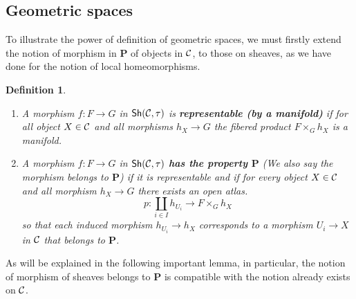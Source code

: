 \documentclass{tufte-book} %
\numberwithin{dummy}{section}
\newtheorem{dfn}[thm]{Definition}
\newcommand{\calc}{{\cal C}}
\newcommand{\lrta}{\longrightarrow}
\newcommand{\ssh}{\mathsf{Sh}}
\newcommand{\bfp}{\mathbf{P}}
\begin{document}
\subsection{Geometric spaces}
To illustrate the  power of definition of geometric spaces, we must firstly extend the notion of morphism in $\bfp$ of objects in $\calc$, to those on sheaves, as we have done for the notion of local homeomorphisms.
\begin{dfn}\label{dfn:geometric_space_property}\ 
\begin{enumerate}
\item A morphism $f: F\lrta G$ in $\ssh(\calc,\tau)$ is \textbf{representable (by a manifold)} if for all object $X\in \calc$ and all morphisms $h_X\lrta G$ the fibered product $F\times_G h_X$ is a manifold.
\item A morphism $f:F\lrta G$ in $\ssh(\calc,\tau)$ \textbf{has the property $\bfp$} (We also say the morphism belongs to $\bfp$) if it is representable and if for every object $X\in\calc$ and all morphism $h_X\lrta G$ there exists an open atlas.
$$
p:\coprod_{i\in I}h_{U_i}\lrta F\times_G h_X
$$
so that each induced morphism $h_{U_i}\lrta h_X$ corresponds to a morphism $U_i\lrta X$ in $\calc$ that belongs to $\bfp$.
\end{enumerate}
\end{dfn} 
As will be explained in the following important lemma, in particular, the notion of morphism of sheaves belongs to $\bfp$ is compatible with the notion already exists on $\calc$.
\end{document}
